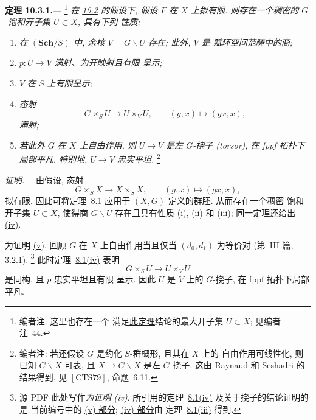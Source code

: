 \medskip
{}\label{thm:sga3-V-10.3.1}%
\noindent\textbf{定理 10.3.1.}---%
\footnote{\label{note:sga3-V-49}编者注: 这里也存在一个
满足\hyperref[thm:sga3-V-10.3.1]{此定理}结论的最大开子集 \(U\subset X\);
见编者\hyperref[note:sga3-V-44]{注~44}.}
\textit{在 \hyperref[sec:sga3-V-10.2]{10.2} 的假设下,
假设 \(F\) 在 \(X\) 上拟有限. 则存在一个稠密的
\(G\)-饱和开子集 \(U\subset X\), 具有下列
性质:}
\begin{enumerate}
\item[(i)]\label{thm:sga3-V-10.3.1-i}%
  \textit{在 \((\mathbf{Sch}/S)\) 中, 余核
  \(V=G\backslash U\) 存在; 此外, \(V\) 是
  赋环空间范畴中的商;}
\item[(ii)]\label{thm:sga3-V-10.3.1-ii}%
  \textit{\(p:U\to V\) 满射、为开映射且有限
  呈示;}
\item[(iii)]\label{thm:sga3-V-10.3.1-iii}%
  \textit{\(V\) 在 \(S\) 上有限呈示;}
\item[(iv)]\label{thm:sga3-V-10.3.1-iv}%
  \textit{态射
  \[
    G\times_SU\longrightarrow U\times_VU,
    \qquad (g,x)\longmapsto(gx,x),
  \]
  满射;}
\item[(v)]\label{thm:sga3-V-10.3.1-v}%
  \textit{若此外 \(G\) 在 \(X\) 上自由作用, 则
  \(U\to V\) 是左 \(G\)-挠子 (torsor), 在 fppf
  拓扑下局部平凡. 特别地, \(U\to V\) 忠实平坦.}%
  \footnote{\label{note:sga3-V-50}编者注: 若还假设
  \(G\) 是约化 \(S\)-群概形, 且其在 \(X\) 上的
  自由作用可线性化, 则已知 \(G\backslash X\)
  可表, 且 \(X\to G\backslash X\) 是左
  \(G\)-挠子. 这由 Raynaud 和 Seshadri 的结果得到,
  见 \(\hyperref[bib:sga3-V-CTS79]{[\mathrm{CTS79}]}\), 命题~6.11.}
\end{enumerate}

\noindent\textit{证明.}---
由假设, 态射
\[
  G\times_SX\longrightarrow X\times_SX,
  \qquad (g,x)\longmapsto(gx,x),
\]
拟有限. 因此可将定理~\hyperref[thm:sga3-V-8.1]{8.1}
应用于 \((X,G)\) 定义的群胚. 从而存在一个稠密
饱和开子集 \(U\subset X\), 使得商
\(G\backslash U\) 存在且具有性质 \hyperref[thm:sga3-V-10.3.1-i]{(i)}, \hyperref[thm:sga3-V-10.3.1-ii]{(ii)} 和 \hyperref[thm:sga3-V-10.3.1-iii]{(iii)};
\hyperref[thm:sga3-V-8.1]{同一定理}还给出 \hyperref[thm:sga3-V-10.3.1-iv]{(iv)}.

为证明 \hyperref[thm:sga3-V-10.3.1-v]{(v)}, 回顾 \(G\) 在 \(X\) 上自由作用当且仅当
\((d_0,d_1)\) 为等价对 (第~III 篇, 3.2.1).%
\footnote{\label{source-note:sga3-V-10.3.1-proof-part-v}源 PDF 此处写作\emph{为证明 (iv)}.
所引用的定理~\hyperref[thm:sga3-V-8.1-iv]{8.1(iv)} 及关于挠子的结论证明的是
当前编号中的 \hyperref[thm:sga3-V-10.3.1-v]{(v) 部分}; \hyperref[thm:sga3-V-10.3.1-iv]{(iv) 部分}由
定理~\hyperref[thm:sga3-V-8.1-iii]{8.1(iii)} 得到.}
此时定理~\hyperref[thm:sga3-V-8.1-iv]{8.1(iv)} 表明
\[
  G\times_SU\longrightarrow U\times_VU
\]
是同构, 且 \(p\) 忠实平坦且有限
呈示. 因此 \(U\) 是 \(V\) 上的 \(G\)-挠子,
在 fppf 拓扑下局部平凡.

